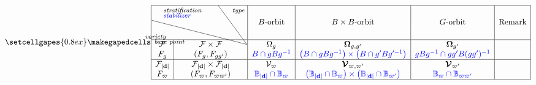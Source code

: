 \documentclass[border={7pt 0pt 200pt 0pt},varwidth]{standalone}
\newcommand{\dimvec}[1]{\mathbf{#1}}
\newcommand{\abdimvec}[1]{|\dimvec{#1}|}
\newcommand{\absgp}[1]{\mathbb{#1}}
\newcommand{\ww}{\varpi}
\newcommand{\Omcell}{\Omega}
\newcommand{\OOmcell}{\boldsymbol{\Omega}}
\newcommand{\Vcell}{\mathcal{V}}
\newcommand{\VVcell}{\boldsymbol{\mathcal{V}}}
\begin{document}
\begin{table}[ht]
 \[
 \setcellgapes{0.8ex}\makegapedcells
\centering
 \begin{array}{|c|c|c|c|c|c|}
 \hline
  \multicolumn{2}{|c|}{\multirow{3}{*}{\hbox{\diagbox[innerwidth=37mm,height=4\line,outerleftsep=-1ex,outerrightsep=-1ex,innerleftsep=3pt,innerrightsep=3pt,font=\footnotesize\itshape]
   {\hspace{-4mm}variety\\[-2mm]base point\\[-1mm]}
   {\hspace{4mm}stratification \\[-2mm] \hspace{4mm}\textcolor{blue}{stabilizer} \hspace{11mm}}
   {type}}}}&&&&\\
 \multicolumn{2}{|c|}{}& \text{$B$-orbit} & \text{$B \times B$-orbit} & \text{$G$-orbit} & \text{Remark}\rule{0mm}{4mm}\\
 \multicolumn{2}{|c|}{}&&&&\rule{0mm}{4mm}\\
  \hline
  \mathcal{F} & \mathcal{F} \times \mathcal{F} & \Omcell_{g} & \OOmcell_{g,g'} & \OOmcell_{g'} &\\
  F_{g} & (F_{g},F_{gg'}) & \textcolor{blue}{B \cap gBg^{-1}} &\textcolor{blue}{\left( B \cap gBg^{-1}\right) \times \left(B \cap g'Bg'^{-1}\right)} & \textcolor{blue}{gBg^{-1} \cap gg'B(gg')^{-1}} &\\\hline
  
  \mathcal{F}_{\abdimvec{d}} & \mathcal{F}_{\abdimvec{d}} \times \mathcal{F}_{\abdimvec{d}} & \Vcell_{\ww} & \VVcell_{\ww,\ww'} & \VVcell_{\ww'} &\\
  F_{\ww} & (F_{\ww},F_{\ww\ww'}) & \textcolor{blue}{\absgp{B}_{\abdimvec{d}} \cap \absgp{B}_{\ww}} & \textcolor{blue}{\left(\absgp{B}_{\abdimvec{d}} \cap \absgp{B}_{\ww}\right) \times \left(\absgp{B}_{\abdimvec{d}} \cap \absgp{B}_{\ww'}\right) }& \textcolor{blue}{\absgp{B}_{\ww} \cap \absgp{B}_{\ww\ww'}} &\\\hline
  

\end{array}\]
\end{table}
\end{document}
